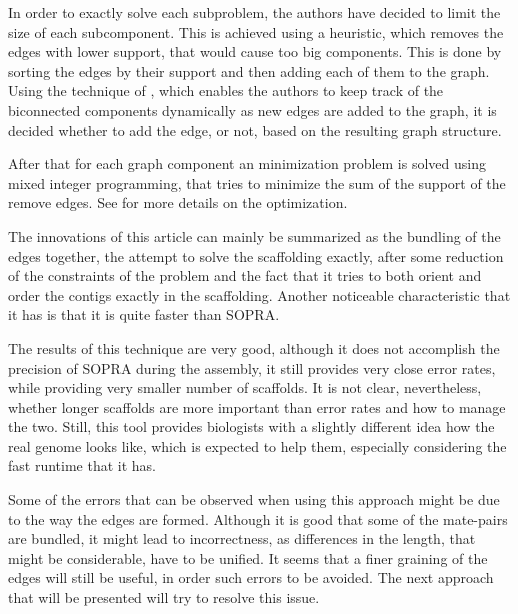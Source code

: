 \documentclass[11pt]{article}
\begin{document}
In order to exactly solve each subproblem, the authors have decided to limit the
size of each subcomponent. This is achieved using a heuristic, which removes the
edges with lower support, that would cause too big components. This is done by
sorting the edges by their support and then adding each of them to the graph.
Using the technique of \cite{westbrook-tarjan}, which enables the authors to
keep track of the biconnected components dynamically as new edges are added to
the graph, it is decided whether to add the edge, or not, based on the resulting
graph structure.

After that for each graph component an minimization problem is solved using
mixed integer programming, that tries to minimize the sum of the support of the
remove edges. See \cite{MIR} for more details on the optimization.

The innovations of this article can mainly be summarized as the bundling of the
edges together, the attempt to solve the scaffolding exactly, after some
reduction of the constraints of the problem and the fact that it tries to both
orient and order the contigs exactly in the scaffolding. Another noticeable
characteristic that it has is that it is quite faster than SOPRA.

The results of this technique are very good, although it does not accomplish the
precision of SOPRA during the assembly, it still provides very close error
rates, while providing very smaller number of scaffolds. It is not clear,
nevertheless, whether longer scaffolds are more important than error rates and
how to manage the two. Still, this tool provides biologists with a slightly
different idea how the real genome looks like, which is expected to help them,
especially considering the fast runtime that it has.

Some of the errors that can be observed when using this approach might be due to
the way the edges are formed. Although it is good that some of the mate-pairs
are bundled, it might lead to incorrectness, as differences in the length, that
might be considerable, have to be unified. It seems that a finer graining of the
edges will still be useful, in order such errors to be avoided. The next
approach that will be presented will try to resolve this issue.

\end{document}
